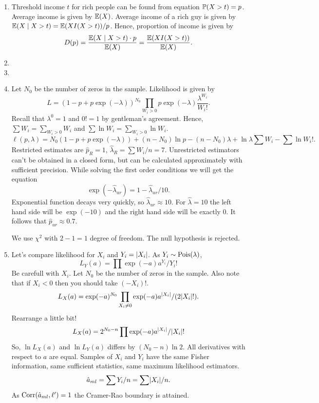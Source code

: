 \begin{enumerate}
    \item 
    Threshold income $t$ for rich people can be found from equation $\P(X > t) = p$.
    Average income is given by $\E(X)$.
    Average income of a rich guy is given by $\E(X \mid X > t) = \E(X I(X>t)) / p$.
    Hence, proportion of income is given by 
    \[
    D(p) = \frac{\E(X \mid X > t) \cdot p}{\E(X)} = \frac{\E(X I(X>t))}{\E(X)}.
    \]
    \item 
    \item 
    \item Let $N_0$ be the number of zeros in the sample.
    Likelihood is given by
    \[
    L = (1 - p + p \exp(-\lambda))^{N_0} \prod_{W_i > 0} p \exp(-\lambda) \frac{\lambda^{W_i}}{W_i!}.
    \]
    Recall that $\lambda^0 = 1$ and $0! = 1$ by gentleman's agreement. 
    Hence, $\sum W_i = \sum_{W_i >0} W_i$ and $\sum \ln W_i = \sum_{W_i > 0} \ln W_i$.
    \[
    \ell(p, \lambda) = N_0 (1 - p + p\exp(-\lambda)) + (n- N_0)\ln p - (n - N_0) \lambda + \ln \lambda \sum W_i - \sum \ln W_i!.
    \]
    Restricted estimates are $\hat p_R = 1$, $\hat \lambda_R = \sum W_i /n = 7$.
    Unrestricted estimators can't be obtained in a closed form, but can be calculated approximately with sufficient precision.
    While solving the first order conditions we will get the equation 
    \[
    \exp(-\hat\lambda_{ur}) = 1 - \hat\lambda_{ur}/10.
    \]
    Exponential function decays very quickly, so $\hat\lambda_{ur} \approx 10$. For $\hat\lambda = 10$ the left hand side will be $\exp(-10)$ and the right hand side will be exactly $0$. 
    It follows that $\hat p_{ur} \approx 0.7$.

    We use $\chi^2$ with $2-1=1$ degree of freedom. The null hypothesis is rejected.
    
    \item Let's compare likelihood for $X_i$ and $Y_i = \abs{X_i}$.
    As $Y_i \sim \dPois(\lambda)$,
    \[
    L_Y(a) = \prod \exp(-a) a^{Y_i} / Y_i!
    \]
    Be carefull with $X_i$. Let $N_0$ be the number of zeros in the sample.
    Also note that if $X_i < 0$ then you should take $(-X_i)!$.
    \[
    L_X(a) = \exp(-a)^{N_0} \prod_{X_i \neq 0} \exp(-a) a^{\abs{X_i}}/(2\abs{X_i}!).
    \]
    Rearrange a little bit!
    \[
    L_X(a) = 2^{N_0 - n} \prod \exp(-a) a^{\abs{X_i}}/ \abs{X_i}!
    \]
    So, $\ln L_X(a)$ and $\ln L_Y(a)$ differs by $(N_0 - n)\ln 2$. 
    All derivatives with respect to $a$ are equal. 
    Samples of $X_i$ and $Y_i$ have the same Fisher information, same sufficient statistics, same maximum likelihood estimators. 
    \[
    \hat a_{ml} = \sum Y_i / n = \sum \abs{X_i}/n.
    \]
    As $\Corr(\hat a_{ml}, \ell') = 1$ the Cramer-Rao boundary is attained. 



\end{enumerate}
